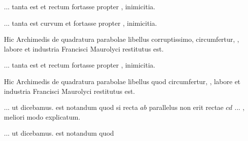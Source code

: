 \documentclass[12pt]{book}
\begin{document}
\par
\Unit ... tanta est 
                       et rectum fortasse propter
, inimicitia.
\par
\Unit ... tanta est 
                         curvum et  fortasse propter
, inimicitia.
\par
\Unit Hic Archimedis de quadratura parabolae libellus  corruptissimo,
circumfertur, , labore et industria
Francisci Maurolyci restitutus est.
\par
\Unit ... tanta est 
                       et rectum fortasse propter
, inimicitia.
\par
\Unit Hic Archimedis de quadratura parabolae libellus 
                       quod circumfertur,
, labore et industria
Francisci Maurolyci restitutus est.
\par
\Unit ... ut dicebamus. \Unit {}
                                 est notandum quod
si recta \(ab\) parallelus non erit rectae \(cd\) ...
\Unit {},
meliori modo explicatum.
\par
\Unit ... ut dicebamus. \Unit {} est notandum quod
\end{document}
